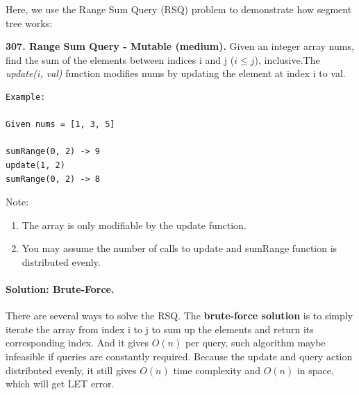 \documentclass[data-structure.tex]{subfiles}
\begin{document}
Here, we use the Range Sum Query (RSQ) problem to demonstrate how segment tree works:
\begin{examples}[resume]
\item \textbf{307. Range Sum Query - Mutable (medium).} Given an integer array nums, find the sum of the elements between indices i and j ($i \leq j$), inclusive.The \textit{update(i, val)} function modifies nums by updating the element at index i to val.
\begin{lstlisting}[numbers=none]
Example:

Given nums = [1, 3, 5]

sumRange(0, 2) -> 9
update(1, 2)
sumRange(0, 2) -> 8
\end{lstlisting}
Note:
\begin{enumerate}
    \item 
    The array is only modifiable by the update function.
   \item  You may assume the number of calls to update and sumRange function is distributed evenly.
\end{enumerate}
\paragraph{Solution: Brute-Force.} There are several ways to solve the RSQ. The \textbf{brute-force solution} is to simply iterate the array from index i to j to sum up the elements and return its corresponding index. And it gives $O(n)$ per query, such algorithm maybe infeasible if queries are constantly required.  Because the update and query action distributed evenly, it still gives $O(n)$ time complexity and $O(n)$ in space, which will get LET error. 


\end{examples}
\end{document}
